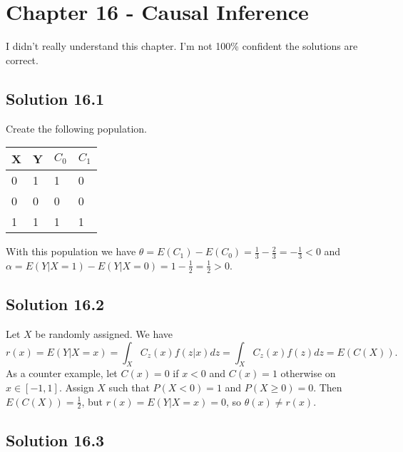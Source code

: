 \section*{Chapter 16 - Causal Inference}

I didn't really understand this chapter.
I'm not 100\% confident the solutions are correct.

\subsection*{Solution 16.1}

Create the following population.

\begin{table}[H]
\begin{tabular}{l|l||l|l}
X & Y & $C_0$ & $C_1$ \\ \hline \hline
0 & 1 & 1    & 0    \\ \hline
0 & 0 & 0    & 0    \\ \hline
1 & 1 & 1    & 1
\end{tabular}
\end{table}
With this population we have $\theta = E(C_1) - E(C_0) = \frac{1}{3} - \frac{2}{3} = -\frac{1}{3} < 0$ and $\alpha = E(Y|X=1) - E(Y|X=0) = 1 - \frac{1}{2} = \frac{1}{2} > 0$.


\subsection*{Solution 16.2}

Let $X$ be randomly assigned.
We have
\begin{equation*}
    r(x) = E(Y|X = x)
        = \int_{X} C_{z}(x) f(z|x) dz
        = \int_{X} C_{z}(x) f(z) dz
        = E(C(X)).
\end{equation*}
As a counter example, let $C(x) = 0$ if $x < 0$ and $C(x) = 1$ otherwise on $x \in [-1, 1]$.
Assign $X$ such that $P(X < 0) = 1$ and $P(X \geq 0) = 0$.
Then $E(C(X)) = \frac{1}{2}$, but $r(x) = E(Y|X = x) = 0$, so $\theta(x) \neq r(x)$.


\subsection*{Solution 16.3}

